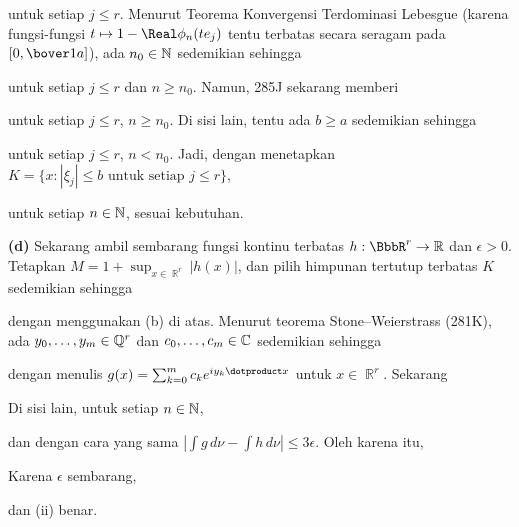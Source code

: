 {\noindent untuk setiap $j\le r$. Menurut Teorema Konvergensi Terdominasi
Lebesgue (karena fungsi-fungsi $t\mapsto 1-\Real\phi_n(te_j)$ tentu terbatas
secara seragam pada $[0,\bover1a]$), ada $n_0\in\Bbb N$ sedemikian sehingga


\noindent untuk setiap $j\le r$ dan $n\ge n_0$. Namun, 285J sekarang memberi


\noindent untuk setiap $j\le r$, $n\ge n_0$. Di sisi lain, tentu ada $b\ge a$
sedemikian sehingga


\noindent untuk setiap $j\le r$, $n<n_0$. Jadi, dengan menetapkan
$K=\{x:|\xi_j|\le b\text{ untuk setiap }j\le r\}$,


\noindent untuk setiap $n\in\Bbb N$, sesuai kebutuhan.  \Qed

\medskip

{\bf (d)} Sekarang ambil sembarang fungsi kontinu terbatas
$h:\BbbR^r\to\Bbb R$ dan $\epsilon>0$. Tetapkan
$M=1+\sup_{x\in\BbbR^r}|h(x)|$, dan pilih himpunan tertutup terbatas $K$
sedemikian sehingga


\noindent dengan menggunakan (b) di atas. Menurut teorema Stone--Weierstrass
(281K), ada $y_0,\ldots,y_m\in\Bbb Q^r$ dan
$c_0,\ldots,c_m\in\Bbb C$ sedemikian sehingga



\noindent dengan menulis $g(x)=\sum_{k=0}^mc_ke^{iy_k\dotproduct x}$ untuk
$x\in\BbbR^r$. Sekarang


\noindent Di sisi lain, untuk setiap $n\in\Bbb N$,


\noindent dan dengan cara yang sama
$|\int g\,d\nu-\int h\,d\nu|\le 3\epsilon$. Oleh karena itu,


\noindent Karena $\epsilon$ sembarang,


\noindent dan (ii) benar.
}%


